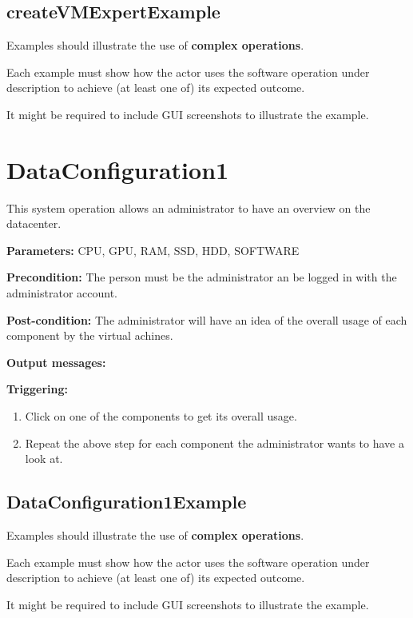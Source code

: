  
\subsection{createVMExpertExample}
Examples should illustrate the use of \textbf{complex operations}.

Each example must show how the actor uses the software operation under
description to achieve (at least one of) its expected outcome.

It might be required to include GUI screenshots to illustrate the example.






\section{DataConfiguration1}
\label{operation:dataconfiguration}
This system operation allows an administrator to have an overview on the
datacenter.

\begin{description}

\item \textbf{Parameters:} CPU, GPU, RAM, SSD, HDD, SOFTWARE
\item \textbf{Precondition:} The person must be the administrator an be logged
in with the administrator account.
\item \textbf{Post-condition:} The administrator will have an idea of the
overall usage of each component by the virtual achines.
\item \textbf{Output messages:}

\item \textbf{Triggering:}
\begin{enumerate}
\item Click on one of the components to get its overall usage.
\item Repeat the above step for each component the administrator wants to have a
look at.
\end{enumerate}

 
\end{description}

 
\subsection{DataConfiguration1Example}
Examples should illustrate the use of \textbf{complex operations}.

Each example must show how the actor uses the software operation under
description to achieve (at least one of) its expected outcome.

It might be required to include GUI screenshots to illustrate the example.
